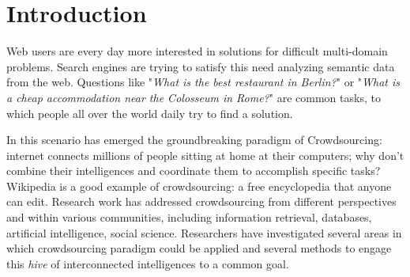
\cleardoublepage
{}

\chapter*{Introduction}
\label{intro}

Web users are every day more interested in solutions for difficult multi-domain
problems. Search engines are trying to satisfy this need analyzing semantic
data from the web. Questions like "\emph{What is the best restaurant in
Berlin?}" or "\emph{What is a cheap accommodation near the Colosseum in Rome?}" are common tasks,
to which people all over the world daily try to find a solution.


In this scenario has emerged the groundbreaking paradigm of Crowdsourcing:
internet connects millions of people sitting at home at their computers;
why don't combine their intelligences and coordinate them to accomplish
specific tasks? Wikipedia is a good example of crowdsourcing: a free
encyclopedia that anyone can edit. Research work has addressed crowdsourcing
from different perspectives and within various communities, including
information retrieval, databases, artificial intelligence, social
science. Researchers have investigated several areas in which crowdsourcing
paradigm could be applied and several methods to engage this \emph{hive}
of interconnected intelligences to a common goal.

